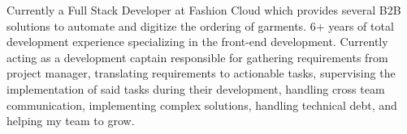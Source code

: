 

\begin{cvparagraph}

Currently a Full Stack Developer at Fashion Cloud which provides several B2B solutions to automate and digitize the ordering of garments. 6+ years of total development experience specializing in the front-end development. Currently acting as a development captain responsible for gathering requirements from project manager, translating requirements to actionable tasks, supervising the implementation of said tasks during their development, handling cross team communication, implementing complex solutions, handling technical debt, and helping my team to grow.
\end{cvparagraph}

